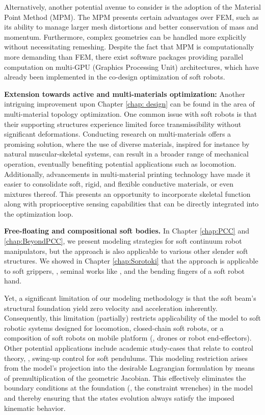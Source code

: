 Alternatively, another potential avenue to consider is the adoption of the Material Point Method (MPM). The MPM presents certain advantages over FEM, such as its ability to manage larger mesh distortions and better conservation of mass and momentum. Furthermore, complex geometries can be handled more explicitly without necessitating remeshing. Despite the fact that MPM is computationally more demanding than FEM, there exist software packages providing parallel computation on multi-GPU (Graphics Processing Unit) architectures, which have already been implemented in the co-design optimization of soft robots.

\textbf{Extension towards active and multi-materials optimization:} Another intriguing improvement upon Chapter \ref{chap: design} can be found in the area of multi-material topology optimization. One common issue with soft robots is that their supporting structures experience limited force transmissibility without significant deformations. Conducting research on multi-materials offers a promising solution, where the use of diverse materials, inspired for instance by natural muscular-skeletal systems, can result in a broader range of mechanical operation, eventually benefiting potential applications such as locomotion. Additionally, advancements in multi-material printing technology have made it easier to consolidate soft, rigid, and flexible conductive materials, or even mixtures thereof. This presents an opportunity to incorporate skeletal function along with proprioceptive sensing capabilities that can be directly integrated into the optimization loop.

\textbf{Free-floating and compositional soft bodies.} In Chapter \ref{chap:PCC} and \ref{chap:BeyondPCC}, we present modeling strategies for soft continuum robot manipulators, but the approach is also applicable to various other slender soft structures. We showed in Chapter \ref{chap:Sorotoki} that the approach is applicable to soft grippers, \eg, seminal works like \cite{Sinatra2019Aug,Suzumori1992}, and the bending fingers of a soft robot hand.

Yet, a significant limitation of our modeling methodology is that the soft beam's structural foundation yield zero velocity and acceleration inherently. Consequently, this limitation (partially) restricts applicability of the model to soft robotic systems designed for locomotion, closed-chain soft robots, or a composition of soft robots on mobile platform (\eg, drones or robot end-effectors). Other potential applications include academic study-cases that relate to control theory, \eg, swing-up control for soft pendulums. This modeling restriction arises from the model's projection into the desirable Lagrangian formulation by means of premultiplication of the geometric Jacobian. This effectively eliminates the boundary conditions at the foundation (\ie, the constraint wrenches) in the model and thereby ensuring that the states evolution always satisfy the imposed kinematic behavior.

